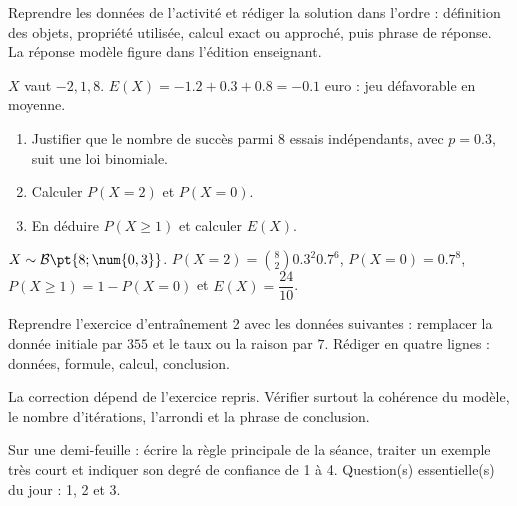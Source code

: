 \begin{example}
Reprendre les données de l'activité et rédiger la solution dans l'ordre : définition des objets, propriété utilisée, calcul exact ou approché, puis phrase de réponse. La réponse modèle figure dans l'édition enseignant.
\end{example}
\begin{solution}$X$ vaut $-2,1,8$. $E(X)=-\num{1,2}+\num{0,3}+\num{0,8}=-\num{0,1}$ euro : jeu défavorable en moyenne.\end{solution}

\begin{exercise}[essentiel]
\begin{enumerate}\item Justifier que le nombre de succès parmi $8$ essais indépendants, avec $p=\num{0,3}$, suit une loi binomiale.\item Calculer $P(X=2)$ et $P(X=0)$.\item En déduire $P(X\geq1)$ et calculer $E(X)$.\end{enumerate}
\end{exercise}
\begin{solution}$X\sim\mathcal B\pt{8;\num{0,3}}$. $P(X=2)=\binom{8}2 \num{0,3}^2 \num{0,7}^{6}$, $P(X=0)=\num{0,7}^{8}$, $P(X\geq1)=1-P(X=0)$ et $E(X)=\dfrac{24}{10}$.\end{solution}


\begin{homework}Reprendre l'exercice d'entraînement 2 avec les données suivantes : remplacer la donnée initiale par $355$ et le taux ou la raison par $7$. Rédiger en quatre lignes : données, formule, calcul, conclusion.\end{homework}
\begin{solution}La correction dépend de l'exercice repris. Vérifier surtout la cohérence du modèle, le nombre d'itérations, l'arrondi et la phrase de conclusion.\end{solution}

\begin{exitticket}[3 minutes]Sur une demi-feuille : écrire la règle principale de la séance, traiter un exemple très court et indiquer son degré de confiance de 1 à 4. Question(s) essentielle(s) du jour : 1, 2 et 3.\end{exitticket}

